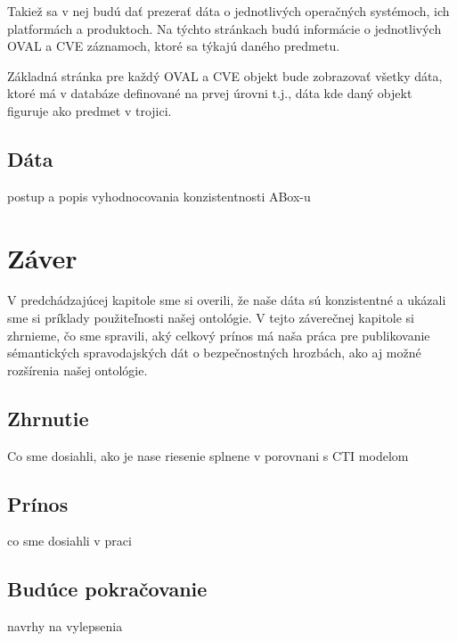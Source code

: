 \documentclass[12pt, a4paper, oneside]{book}
\begin{document}
Takiež sa v nej budú dať prezerať dáta o jednotlivých operačných systémoch, ich platformách a produktoch. Na týchto stránkach budú informácie o jednotlivých OVAL a CVE záznamoch, ktoré sa týkajú daného predmetu.


Základná stránka pre každý OVAL a CVE objekt bude zobrazovať všetky dáta, ktoré má v databáze definované na prvej úrovni t.j., dáta kde daný objekt figuruje ako predmet v trojici. 


\section{Dáta}
postup a popis vyhodnocovania konzistentnosti ABox-u


\chapter{Záver}
V predchádzajúcej kapitole sme si overili, že naše dáta sú konzistentné a ukázali sme si príklady použiteľnosti našej ontológie. V tejto záverečnej kapitole si zhrnieme, čo sme spravili, aký celkový prínos má naša práca pre publikovanie sémantických spravodajských dát o bezpečnostných hrozbách, ako aj možné rozšírenia našej ontológie.
\section{Zhrnutie}
Co sme dosiahli, ako je nase riesenie splnene v porovnani s CTI modelom


\section{Prínos}
co sme dosiahli v praci


\section{Budúce pokračovanie}
navrhy na vylepsenia

\nocite{*}



\listoffigures
\end{document}
